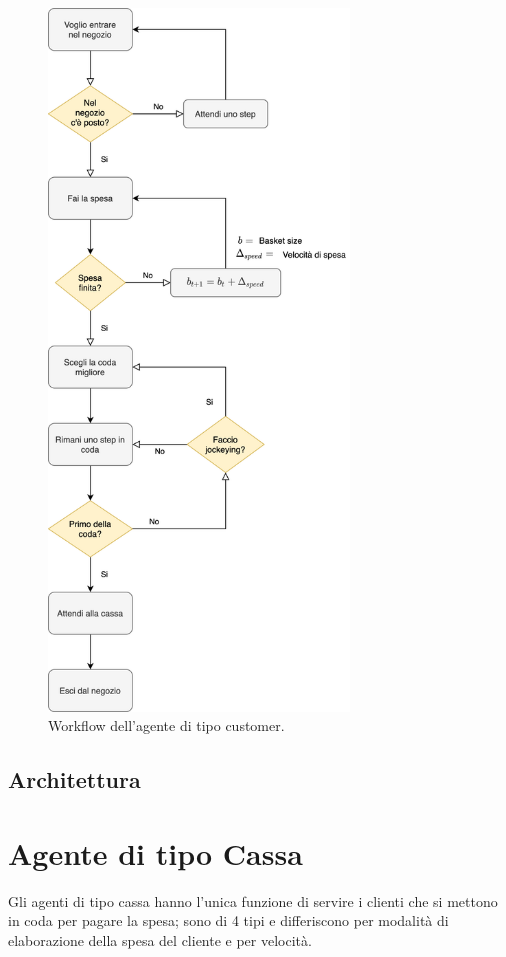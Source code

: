\begin{figure}[htp!]
	\centering
	\hspace*{3cm}
	\includegraphics[width=8cm]{"images/workflow_customer.png"}
	\caption{Workflow dell'agente di tipo customer.}
	\label{fig:workflow_customer}
\end{figure}


\subsection{Architettura}

\section{Agente di tipo Cassa}
\label{model:cashdesks}


Gli agenti di tipo cassa hanno l'unica funzione di servire i clienti che si mettono in coda per pagare la spesa; sono di 4 tipi e differiscono per modalità di elaborazione della spesa del cliente e per velocità.

